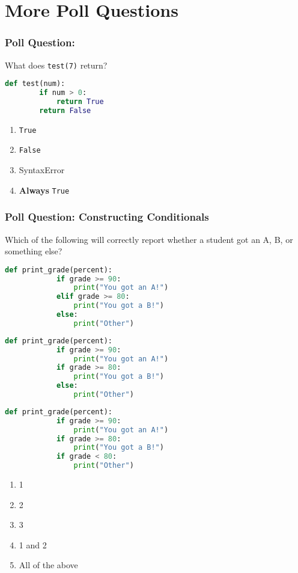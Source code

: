 \documentclass{beamer}
\begin{document}
%
%
\section{More Poll Questions}
\begin{frame}[fragile]
	\frametitle{Poll Question: }
	What does \lstinline|test(7)| return?
	\begin{lstlisting}[language=Python, autogobble]
	def test(num):
		if num > 0:
			return True
		return False
	\end{lstlisting}
	\vfill
	\begin{enumerate}[A]
		\item \lstinline|True|
		\item \lstinline|False|
		\item SyntaxError
		\item \textbf{Always} \lstinline|True|
	\end{enumerate}
\end{frame}

%
%
\begin{frame}[fragile]
	\frametitle{Poll Question: Constructing Conditionals}
	Which of the following will correctly report whether a student got an A, B, or something else?\\
	\vfill
	\begin{minipage}{0.32\textwidth}
		\begin{lstlisting}[language=Python, autogobble,basicstyle=\tiny,numbers=none]
		def print_grade(percent):
			if grade >= 90:
				print("You got an A!")
			elif grade >= 80:
				print("You got a B!")
			else:
				print("Other")
		\end{lstlisting}
	\end{minipage}
	\begin{minipage}{0.32\textwidth}
		\begin{lstlisting}[language=Python, autogobble,basicstyle=\tiny,numbers=none]
		def print_grade(percent):
			if grade >= 90:
				print("You got an A!")
			if grade >= 80:
				print("You got a B!")
			else:
				print("Other")
		\end{lstlisting}
	\end{minipage}
	\begin{minipage}{0.32\textwidth}
		\begin{lstlisting}[language=Python, autogobble,basicstyle=\tiny,numbers=none]
		def print_grade(percent):
			if grade >= 90:
				print("You got an A!")
			if grade >= 80:
				print("You got a B!")
			if grade < 80:
				print("Other")
		\end{lstlisting}
	\end{minipage}
	\vfill
	\begin{enumerate}[A]
		\item 1
		\item 2
		\item 3
		\item 1 and 2
		\item All of the above
	\end{enumerate}
\end{frame}
\end{document}
